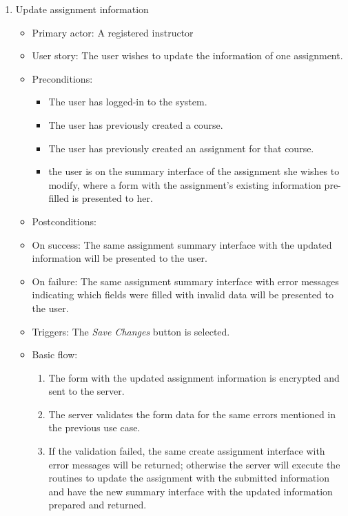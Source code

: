 \begin{enumerate}
\item Update assignment information
\begin{itemize}
    \item Primary actor: A registered instructor
    \item User story: The user wishes to update the information of one
        assignment.
    \item Preconditions:
        \begin{itemize}
            \item The user has logged-in to the system.
            \item The user has previously created a course.
            \item The user has previously created an assignment for that course.
            \item the user is on the summary interface of the assignment she
                wishes to modify, where a form with the assignment's existing
                information pre-filled is presented to her.
        \end{itemize}
    \item Postconditions:
        \item On success: The same assignment summary interface with the updated
            information will be presented to the user.
        \item On failure: The same assignment summary interface with error
            messages indicating which fields were filled with invalid data will
            be presented to the user.
    \item Triggers: The \emph{Save Changes} button is selected.
    \item Basic flow:
        \begin{enumerate}
            \item The form with the updated assignment information is encrypted
                and sent to the server.
            \item The server validates the form data for the same errors
                mentioned in the previous use case.
            \item If the validation failed, the same create assignment interface
                with error messages will be returned; otherwise the server will
                execute the routines to update the assignment with the submitted
                information and have the new summary interface with the updated
                information prepared and returned.
        \end{enumerate}
\end{itemize}


\end{enumerate}
